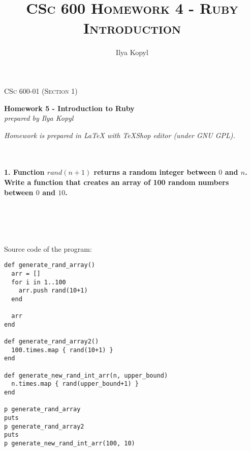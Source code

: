 \documentclass{article}
\author{Ilya Kopyl}
\begin{document}
	\setlength{\grammarparsep}{5pt plus 1pt minus 1pt} %
	\setlength{\grammarindent}{13em} %




	\begin{titlepage}
		\begin{center}
				\Large\textsc{CSc 600-01 (Section 1)}
				
				\Large\textbf{Homework 5 - Introduction to Ruby}\\

				\Large\textit{prepared by Ilya Kopyl}
				
		\end{center}	
	\end{titlepage}


	\title{\textsc{CSc 600 Homework 4 - Ruby Introduction}}	
	\maketitle
	
		\noindent \textit{Homework is prepared in LaTeX with TeXShop editor (under GNU GPL).}
		


	\rmfamily\




	\paragraph{1. Function \(rand(n+1)\) returns a random integer between \(0\) and \(n\). Write a function that creates an array of 100 random numbers between \(0\) and \(10\).}\

\paragraph{}\

Source code of the program:

\begin{verbatim}
def generate_rand_array()
  arr = []
  for i in 1..100
    arr.push rand(10+1)
  end

  arr
end

def generate_rand_array2()
  100.times.map { rand(10+1) }
end

def generate_new_rand_int_arr(n, upper_bound)
  n.times.map { rand(upper_bound+1) }
end

p generate_rand_array
puts
p generate_rand_array2
puts
p generate_new_rand_int_arr(100, 10)
\end{verbatim}
\end{document}
